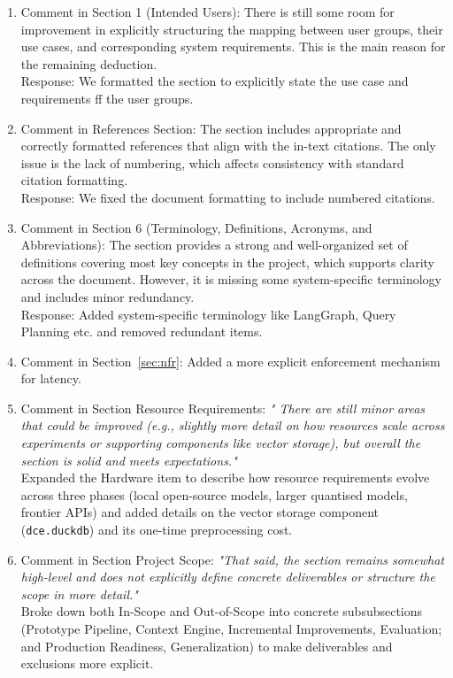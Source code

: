 \begin{enumerate}
\item Comment in Section 1 (Intended Users): There is still some room for improvement in explicitly structuring the mapping between user groups, their use cases, and corresponding system requirements. This is the main reason for the remaining deduction.
\\Response: We formatted the section to explicitly state the use case and requirements ff the user groups.
\item Comment in References Section: The section includes appropriate and correctly formatted references that align with the in-text citations. The only issue is the lack of numbering, which affects consistency with standard citation formatting.
\\Response: We fixed the document formatting to include numbered citations.
\item Comment in Section 6 (Terminology, Definitions, Acronyms, and Abbreviations): The section provides a strong and well-organized set of definitions covering most key concepts in the project, which supports clarity across the document. However, it is missing some system-specific terminology and includes minor redundancy.
\\Response: Added system-specific terminology like LangGraph, Query Planning etc. and removed redundant items.
\item Comment in Section~\ref{sec:nfr}: Added a more explicit enforcement mechanism for latency.
\item Comment in Section Resource Requirements: \textit{" There are still minor areas that could be improved (e.g., slightly more detail on how resources scale across experiments or supporting components like vector storage), but overall the section is solid and meets expectations."} \\
Expanded the Hardware item to describe how resource requirements evolve across three phases (local open-source models, larger quantised models, frontier APIs) and added details on the vector storage component (\texttt{dce.duckdb}) and its one-time preprocessing cost.
\item Comment in Section Project Scope: \textit{"That said, the section remains somewhat high-level and does not explicitly define concrete deliverables or structure the scope in more detail."} \\
Broke down both In-Scope and Out-of-Scope into concrete subsubsections (Prototype Pipeline, Context Engine, Incremental Improvements, Evaluation; and Production Readiness, Generalization) to make deliverables and exclusions more explicit.

\end{enumerate}
